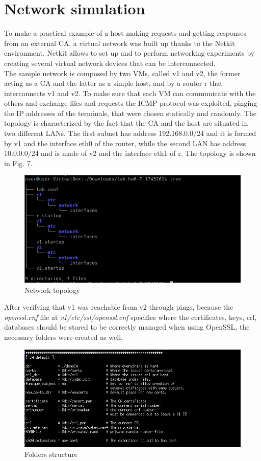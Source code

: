 \documentclass[11pt]{article}
\begin{document}
\section{Network simulation}
To make a practical example of a host making requests and getting responses from an external CA, a virtual network was built up thanks to the Netkit environment. Netkit allows to set up and to perform networking experiments by creating several virtual network devices that can be interconnected. \\ The sample network is composed by two VMs, called v1 and v2, the former acting as a CA and the latter as a simple host, and by a router r that interconnects v1 and v2.
To make sure that each VM can communicate with the others and exchange files and requests the ICMP protocol was exploited, pinging the IP addresses of the terminals, that were chosen statically and randomly. The topology is characterized by the fact that the CA and the host are situated in two different LANs. The first subnet has address 192.168.0.0/24 and it is formed by v1 and the interface eth0 of the router, while the second LAN has address 10.0.0.0/24 and is made of v2 and the interface eth1 of r. The topology is shown in Fig. 7.\\
\begin{figure}[H]
	\includegraphics[width=1\textwidth]{img8-hw7-1743261.png}
	\caption{Network topology}
\end{figure}
\clearpage
After verifying that v1 was reachable from v2 through pings, because the \textit{openssl.cnf} ﬁle at \textit{v1/etc/ssl/openssl.cnf} speciﬁes where the certiﬁcates, keys, crl, databases should be stored to be correctly managed when using OpenSSL, the necessary folders were created as well.\\
\begin{figure}[H]
	\includegraphics[width=1\textwidth]{img9-hw7-1743261.png}
	\caption{Folders structure}
\end{figure}
\end{document}
